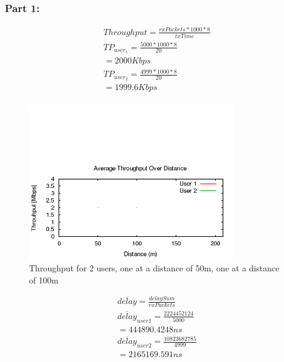 \subsubsection{Part 1:}

\begin{gather*}
	Throughput=\frac{rxPackets*1000*8}{txTime} \\
	TP_{user_1}=\frac{5000*1000*8}{20} \\
	= 2000 Kbps \\
	TP_{user_2}=\frac{4999*1000*8}{20} \\
	= 1999.6 Kbps \\
\end{gather*}

\begin{figure}[H]
	\centering
	\includegraphics[width=0.8\textwidth]{images/EE500/QC/P1/Images/wifi-throughput}
	\caption{Throughput for 2 users, one at a distance of 50m, one at a
	distance of 100m}
	\label{fig:QCP1throughput}
\end{figure}

\begin{gather*}
	\overline{delay}=\frac{delaySum}{rxPackets} \\
	\overline{delay}_{user 1}=\frac{2224452124}{5000} \\
	= 444890.4248ns \\
	\overline{delay}_{user 2}=\frac{10823682785}{4999} \\
	= 2165169.591ns \\
\end{gather*}

